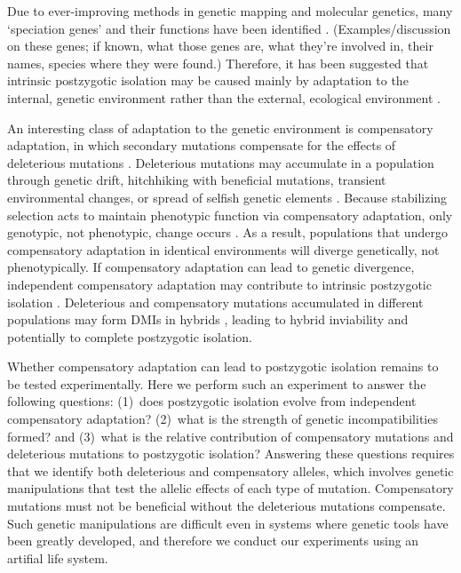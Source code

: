 \documentclass{article}
\begin{document}

Due to ever-improving methods in genetic mapping and molecular genetics,
many `speciation genes' and their functions have been identified
\cite{noo06,mah11}.
%
(Examples/discussion on these genes; if known, what those genes are,
what they're involved in, their names, species where they were found.)
%
Therefore, it has been suggested that intrinsic postzygotic isolation
may be caused mainly by adaptation to the internal, genetic environment
rather than the external, ecological environment \cite{pha09,pre10}.


An interesting class of adaptation to the genetic environment
is compensatory adaptation, in which secondary mutations
compensate for the effects of deleterious mutations
\cite{har96,bur99,moo00,lev00,mai02,est03,est11}.
%
Deleterious mutations may accumulate in a population
through genetic drift, hitchhiking with beneficial mutations,
transient environmental changes, or spread of selfish genetic elements
\cite{pre10}. %
%
Because stabilizing selection acts to maintain phenotypic function
via compensatory adaptation, only genotypic, not phenotypic, change occurs
\cite{har96}.
%
As a result, populations that undergo compensatory adaptation
in identical environments will diverge genetically, not phenotypically.
%
If compensatory adaptation can lead to genetic divergence,
independent compensatory adaptation may contribute to
intrinsic postzygotic isolation \cite{orr01,kon02,kul04,lan07,sch09b,pre10}.
%
Deleterious and compensatory mutations accumulated in different populations
may form DMIs in hybrids \cite{har96}, leading to hybrid inviability
and potentially to complete postzygotic isolation.



Whether compensatory adaptation can lead to postzygotic isolation
remains to be tested experimentally.
%
Here we perform such an experiment to answer the following questions:
(1)~does postzygotic isolation evolve from independent compensatory adaptation?
(2)~what is the strength of genetic incompatibilities formed?
and (3)~what is the relative contribution of compensatory mutations
and deleterious mutations to postzygotic isolation?
%
Answering these questions requires that we identify
both deleterious and compensatory alleles,
which involves genetic manipulations that test the allelic
effects of each type of mutation.
%
Compensatory mutations must not be beneficial
without the deleterious mutations compensate.
%
Such genetic manipulations are difficult even in
systems where genetic tools have been greatly developed,
and therefore we conduct our experiments using an artifial life system.
\end{document}
